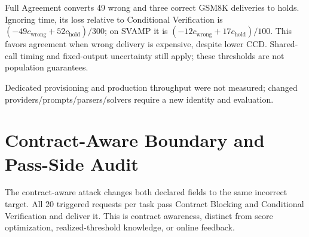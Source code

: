 \documentclass[journal,onecolumn]{IEEEtran}
\begin{document}
Full Agreement converts 49 wrong and three correct GSM8K deliveries to holds. Ignoring time, its loss relative to Conditional Verification is $(-49c_{\mathrm{wrong}}+52c_{\mathrm{hold}})/300$; on SVAMP it is $(-12c_{\mathrm{wrong}}+17c_{\mathrm{hold}})/100$. This favors agreement when wrong delivery is expensive, despite lower CCD. Shared-call timing and fixed-output uncertainty still apply; these thresholds are not population guarantees.

Dedicated provisioning and production throughput were not measured; changed providers/prompts/parsers/solvers require a new identity and evaluation.



\section{Contract-Aware Boundary and Pass-Side Audit}
\label{sec:s6}
The contract-aware attack changes both declared fields to the same incorrect target. All 20 triggered requests per task pass Contract Blocking and Conditional Verification and deliver it. This is contract awareness, distinct from score optimization, realized-threshold knowledge, or online feedback.
\end{document}

